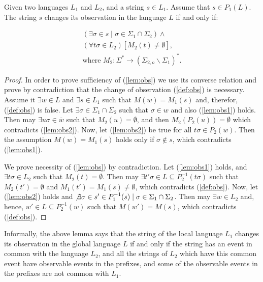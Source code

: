 \begin{lemma}
\label{lem_changed_observation}
Given two languages $L_1$ and $L_2$, and a string $s \in L_1$.
Assume that $s \in P_1(L)$. The string $s$ changes its observation in the
language $L$ if and only if:
\end{lemma}
\begin{subequations}\label{lem:obs}
\begin{align}
	(\exists \sigma \in s \mid \sigma \in \Sigma_1 \cap \Sigma_2) \land
	\label{lem:obs1}
	\\
	(\forall t\sigma \in L_2)
	\left[M_2(t) \neq \emptyset \right],
	\label{lem:obs2}
	\\
	\textrm{where } M_2: \Sigma^* \rightarrow (\Sigma_{2,o} \backslash
	\Sigma_1)^*. 
	\label{lem:obs3}
\end{align}
\end{subequations}

\begin{proof}
In order to prove sufficiency of (\ref{lem:obs}) we use its converse relation
and prove by contradiction that the change of observation (\ref{def:obs}) is
necessary.
Assume it $\exists w \in L$ and $\exists s \in L_1$ such that
$M(w)= M_1(s)$ and, therefor, (\ref{def:obs}) is false. Let $\exists
\sigma \in \Sigma_1 \cap \Sigma_2$ such that $\sigma \in w$ and also
(\ref{lem:obs1}) holds. Then may $\exists u \sigma \in \overline{w}$ such that
$M_2(u) = \emptyset$, and then $M_2(P_2(u)) =
\emptyset$ which contradicts (\ref{lem:obs2}). Now, let (\ref{lem:obs2})
be true for all $t\sigma \in P_2(w)$. Then the assumption $M(w)=
M_1(s)$ holds only if $\sigma \not \in s$, which contradicts (\ref{lem:obs1}). 

We prove necessity of (\ref{lem:obs}) by contradiction.
Let (\ref{lem:obs1}) holds, and $\exists t\sigma \in L_2$ such that
$M_2(t) = \emptyset$. Then may $\exists t'\sigma \in 
L \subseteq P_2^{-1}(t\sigma)$ such that $M_2(t') =
\emptyset$ and $M_1(t') = M_1(s) \neq \emptyset$, which contradicts
(\ref{def:obs}).
Now, let (\ref{lem:obs2}) holds and $\not \exists \sigma \in s' \in P_1^{-1}(s)
\mid \sigma \in \Sigma_1 \cap \Sigma_2$. Then may $\exists w \in L_2$ and,
hence, $w' \in L \subseteq P_2^{-1}(w)$ such that $M(w')=M(s)$,
which contradicts (\ref{def:obs}).
\end{proof}

Informally, the above lemma says that the string of the local language $L_1$
changes its observation in the global language $L$ if and only if the string has
an event in common with the language $L_2$, and all the strings of $L_2$ which
have this common event have observable events in the prefixes, and some of the
observable events in the prefixes are not common with $L_1$.

